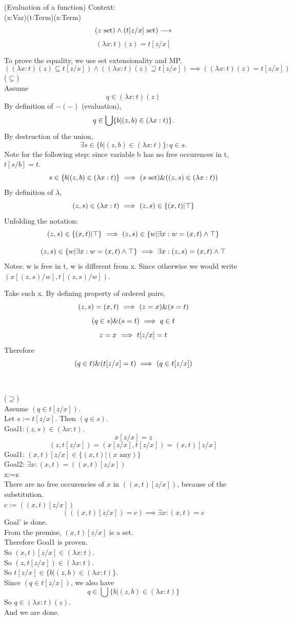 \begin{theorem}(Evaluation of a function)
Context:\\
(x:Var)(t:Term)(z:Term)
\[
(z\mathrm{\ set}) \land (t[z/x]\mathrm{\ set}) \longrightarrow
\]
\[
(\lambda x: t)(z) = t[z/x]
\]
\end{theorem}
\Proof
To prove the equality, we use set extensionality and MP.
\[
((\lambda x: t)(z) \subseteq t[z/x] )
\land
((\lambda x: t)(z) \supseteq t[z/x] )
\implies
((\lambda x: t)(z) = t[z/x] )
\]
($\subseteq$)\\
Assume 
\[
q\in (\lambda x: t)(z)
\]
By definition of $-(-)$ (evaluation),
\[
q\in\bigcup \{b|(z,b)\in(\lambda x:t)\}.
\]
By destruction of the union,
\[
\exists s\in \{b|(z,b)\in(\lambda x:t)\}: q\in s.
\]
Note for the following step: since variable b has no free occurences in t, $t[s/b]=t$.
\[
s\in \{b|(z,b)\in(\lambda x:t)\}
\ \Longrightarrow\ 
(s\mathrm{\ set}) \& ((z,s)\in(\lambda x:t))
\]
By definition of $\lambda$,
\[
(z,s)\in(\lambda x:t)
\ \Longrightarrow\ 
(z,s)\in \{(x,t)|\top\}
\]
Unfolding the notation:
\[
(z,s)\in \{(x,t)|\top\}
\ \Longrightarrow\ 
(z,s)\in \{w|\exists x: w = (x,t) \land \top\}
\]

\[
(z,s)\in \{w|\exists x: w = (x,t) \land \top\}
\ \Longrightarrow\ 
\exists x: (z,s) = (x,t) \land \top
\]
Notes: w is free in t, w is different from x. Since otherwise we would write $(x[(z,s)/w],t[(z,s)/w])$.

Take such x. By defining property of ordered pairs,
\[
(z,s) = (x,t)
\ \Longrightarrow\ 
(z=x) \& (s=t)
\]
\[
(q\in s)\& (s=t)
\ \Longrightarrow\ 
q\in t
\]
\[
z=x
\ \Longrightarrow\ 
t[z/x]=t
\]
Therefore
\[
(q\in t) \& (t[z/x]=t)
\ \Longrightarrow\ 
(q \in t[z/x])
\]
\ \\
\ \\
($\supseteq$)\\
Assume $(q \in t[z/x])$.\\
Let $s:=t[z/x]$. Then $(q\in s)$.\\
Goal1:$(z,s)\in(\lambda x:t)$.\\
\[
x[z/x]=z
\]
\[
(z,t[z/x]) = (x[z/x],t[z/x])=(x,t)[z/x]
\]
Goal1: $(x,t)[z/x]\in\{(x,t)|(x\mbox{ any})\}$\\
Goal2: $\exists x:(x,t)=((x,t)[z/x])$\\
x:=z\\
There are no free occurencies of $x$ in $((x,t)[z/x])$, because of the substitution.\\
$c:=((x,t)[z/x])$\\
\[
(((x,t)[z/x])=c)\implies\exists x: (x,t)=c
\]
Goal' is done.\\

From the premise, $(x,t)[z/x]$ is a set.\\
Therefore Goal1 is proven.\\
So $(x,t)[z/x]\in (\lambda x:t)$.\\
So $(z,t[z/x])\in (\lambda x:t)$.\\
So $t[z/x]\in \{b|(z,b)\in(\lambda x:t)\}$.\\
Since $(q \in t[z/x])$, we also have
\[
q\in \bigcup \{b|(z,b)\in(\lambda x: t)\}
\]
So $q\in (\lambda x: t)(z)$.\\
And we are done.\\
\Done


